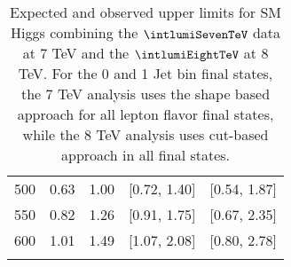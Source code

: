 \begin{table}[!htbp]
\begin{center}
\begin{tabular}{c c c c c}
500 & 0.63 & 1.00 & [0.72, 1.40] & [0.54, 1.87] \\
550 & 0.82 & 1.26 & [0.91, 1.75] & [0.67, 2.35] \\
600 & 1.01 & 1.49 & [1.07, 2.08] & [0.80, 2.78] \\
\vspace{-3mm} && \\
\hline
\end{tabular}
\caption{Expected and observed upper limits for SM Higgs combining the $\intlumiSevenTeV$ data
at 7 TeV and the $\intlumiEightTeV$ at 8 TeV.
For the 0 and 1 Jet bin final states, the 7 TeV analysis uses the shape based approach for all
lepton flavor final states, while the 8 TeV analysis uses cut-based approach in all final states.}
\label{tab:uls_cut_comb}
\end{center}
\end{table} 

